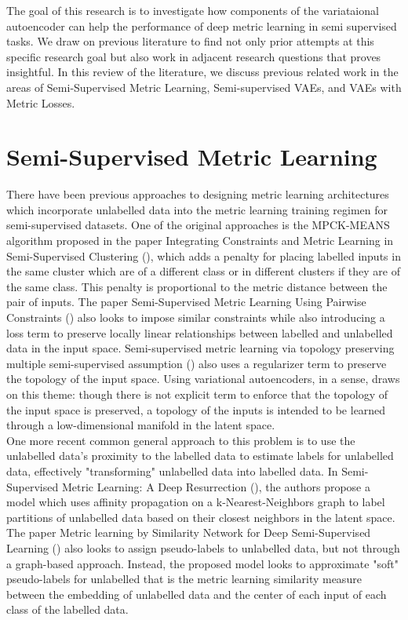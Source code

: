 \documentclass[./dissertation.tex]{subfiles}
\begin{document}

The goal of this research is to investigate how components of the variataional autoencoder can help the performance of deep metric learning in semi supervised tasks. We draw on previous literature to find not only prior attempts at this specific research goal but also work in adjacent research questions that proves insightful. In this review of the literature, we discuss previous related work in the areas of Semi-Supervised Metric Learning, Semi-supervised VAEs, and VAEs with Metric Losses. 


\section{Semi-Supervised Metric Learning}
There have been previous approaches to designing metric learning architectures which incorporate unlabelled data into the metric learning training regimen for semi-supervised datasets. One of the original approaches is the MPCK-MEANS algorithm proposed in the paper Integrating Constraints and Metric Learning in Semi-Supervised Clustering (\cite{bilenko2004integrating}), which adds a penalty for placing labelled inputs in the same cluster which are of a different class or in different clusters if they are of the same class. This penalty is proportional to the metric distance between the pair of inputs. The paper Semi-Supervised Metric Learning Using Pairwise Constraints (\cite{baghshah2009semi}) also looks to impose similar constraints while also introducing a loss term to preserve locally linear relationships between labelled and unlabelled data in the input space. Semi-supervised metric learning via topology preserving multiple semi-supervised assumption (\cite{wang2013semi}) also uses a regularizer term to preserve the topology of the input space. Using variational autoencoders, in a sense, draws on this theme: though there is not explicit term to enforce that the topology of the input space is preserved, a topology of the inputs is intended to be learned through a low-dimensional manifold in the latent space. \\

One more recent common general approach to this problem is to use the unlabelled data's proximity to the labelled data to estimate labels for unlabelled data, effectively "transforming" unlabelled data into labelled data. In Semi-Supervised Metric Learning: A Deep Resurrection (\cite{dutta2021semi}), the authors propose a model which uses affinity propagation on a k-Nearest-Neighbors graph to label partitions of unlabelled data based on their closest neighbors in the latent space. The paper Metric learning by Similarity Network for Deep Semi-Supervised Learning (\cite{wu2020metric}) also looks to assign pseudo-labels to unlabelled data, but not through a graph-based approach. Instead, the proposed model looks to approximate "soft" pseudo-labels for unlabelled that is the metric learning similarity measure between the embedding of unlabelled data and the center of each input of each class of the labelled data. \\
\end{document}
